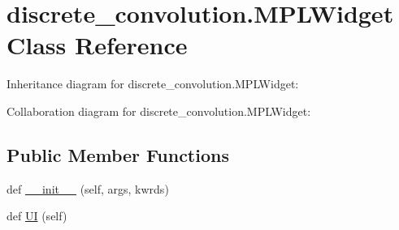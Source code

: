 \hypertarget{classdiscrete__convolution_1_1MPLWidget}{}\section{discrete\+\_\+convolution.\+M\+P\+L\+Widget Class Reference}
\label{classdiscrete__convolution_1_1MPLWidget}


Inheritance diagram for discrete\+\_\+convolution.\+M\+P\+L\+Widget\+:


Collaboration diagram for discrete\+\_\+convolution.\+M\+P\+L\+Widget\+:
\subsection*{Public Member Functions}
\begin{DoxyCompactItemize}
\item 
def \hyperlink{classdiscrete__convolution_1_1MPLWidget_ae7c601a4828a8f8446772c70d0fa7151}{\+\_\+\+\_\+init\+\_\+\+\_\+} (self, args, kwrds)
\item 
def \hyperlink{classdiscrete__convolution_1_1MPLWidget_a7d1f966ed43f2100c28c8b114d8bba4e}{UI} (self)
\end{DoxyCompactItemize}
